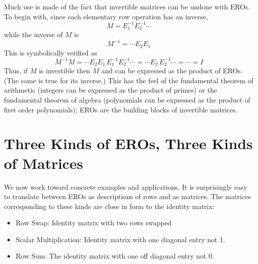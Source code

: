 Much use is made of the fact that invertible matrices can be undone with EROs. 
To begin with, since each  elementary row operation has an inverse, 
\[
M= E_1^{-1} E_2^{-1} \cdots
\]
while the inverse of $M$ is 
\begin{equation*}
M^{-1}=\cdots E_2 E_1 
\end{equation*}
This is symbolically verified as
\begin{equation*}
M^{-1}M=\cdots E_2 E_1\, E_1^{-1} E_2^{-1} \cdots
=\cdots E_2 \, E_2^{-1} \cdots = \cdots = I
\end{equation*}
Thus, if $M$ is invertible then  $M$ and can be expressed as the product of EROs. (The same is true for its inverse.) This has the feel of the fundamental theorem of arithmetic (integers can be expressed as the product of primes) or the fundamental theorem of algebra (polynomials can be expressed as the product of first order polynomials); EROs are the building blocks of invertible matrices. 




\section{Three Kinds of EROs, Three Kinds of Matrices}

We now work toward concrete examples and applications. 
It is surprisingly easy to translate between EROs as descriptions of rows and as matrices.
The matrices corresponding to these kinds are close in form to the identity matrix:
\begin{itemize}
\item Row Swap: Identity matrix with two rows swapped
\item Scalar Multiplication:  Identity matrix with one diagonal entry not 1.
\item Row Sum: The identity matrix with one off diagonal entry not 0.
\end{itemize}


